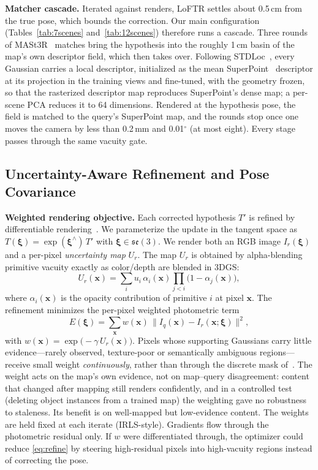 \documentclass[journal]{IEEEtran}
\begin{document}
\textbf{Matcher cascade.} Iterated against renders, LoFTR settles about 0.5\,cm from the true pose, which bounds the correction. Our main configuration (Tables~\ref{tab:7scenes} and~\ref{tab:12scenes}) therefore runs a cascade. Three rounds of MASt3R~\cite{mast3r} matches bring the hypothesis into the roughly 1\,cm basin of the map's own descriptor field, which then takes over. Following STDLoc~\cite{stdloc}, every Gaussian carries a local descriptor, initialized as the mean SuperPoint~\cite{superpoint} descriptor at its projection in the training views and fine-tuned, with the geometry frozen, so that the rasterized descriptor map reproduces SuperPoint's dense map; a per-scene PCA reduces it to 64 dimensions. Rendered at the hypothesis pose, the field is matched to the query's SuperPoint map, and the rounds stop once one moves the camera by less than 0.2\,mm and 0.01$^\circ$ (at most eight). Every stage passes through the same vacuity gate.

\subsection{Uncertainty-Aware Refinement and Pose Covariance}
\label{sec:refine}
\textbf{Weighted rendering objective.} Each corrected hypothesis $T'$ is refined by differentiable rendering~\cite{icomma}. We parameterize the update in the tangent space as $T(\bm\xi)=\exp(\bm\xi^{\wedge})\,T'$ with $\bm\xi\in\mathfrak{se}(3)$. We render both an RGB image $I_r(\bm\xi)$ and a per-pixel \emph{uncertainty map} $U_r$. The map $U_r$ is obtained by alpha-blending primitive vacuity exactly as color/depth are blended in 3DGS:
\begin{equation}
U_r(\mathbf{x})=\sum_{i} u_i\,\alpha_i(\mathbf{x})\!\prod_{j<i}\!\big(1-\alpha_j(\mathbf{x})\big),
\label{eq:ublend}
\end{equation}
where $\alpha_i(\mathbf{x})$ is the opacity contribution of primitive $i$ at pixel $\mathbf{x}$. The refinement minimizes the per-pixel weighted photometric term
\begin{equation}
E(\bm\xi)=\sum_{\mathbf{x}} w(\mathbf{x})\,\big\|I_q(\mathbf{x})-I_r(\mathbf{x};\bm\xi)\big\|^2,
\label{eq:refine}
\end{equation}
with $w(\mathbf{x})=\exp\!\big(-\gamma\,U_r(\mathbf{x})\big)$. Pixels whose supporting Gaussians carry little evidence---rarely observed, texture-poor or semantically ambiguous regions---receive small weight \emph{continuously}, rather than through the discrete mask of~\cite{chukim}. The weight acts on the map's own evidence, not on map--query disagreement: content that changed after mapping still renders confidently, and in a controlled test (deleting object instances from a trained map) the weighting gave no robustness to staleness. Its benefit is on well-mapped but low-evidence content. The weights are held fixed at each iterate (IRLS-style). Gradients flow through the photometric residual only. If $w$ were differentiated through, the optimizer could reduce \eqref{eq:refine} by steering high-residual pixels into high-vacuity regions instead of correcting the pose.
\end{document}
